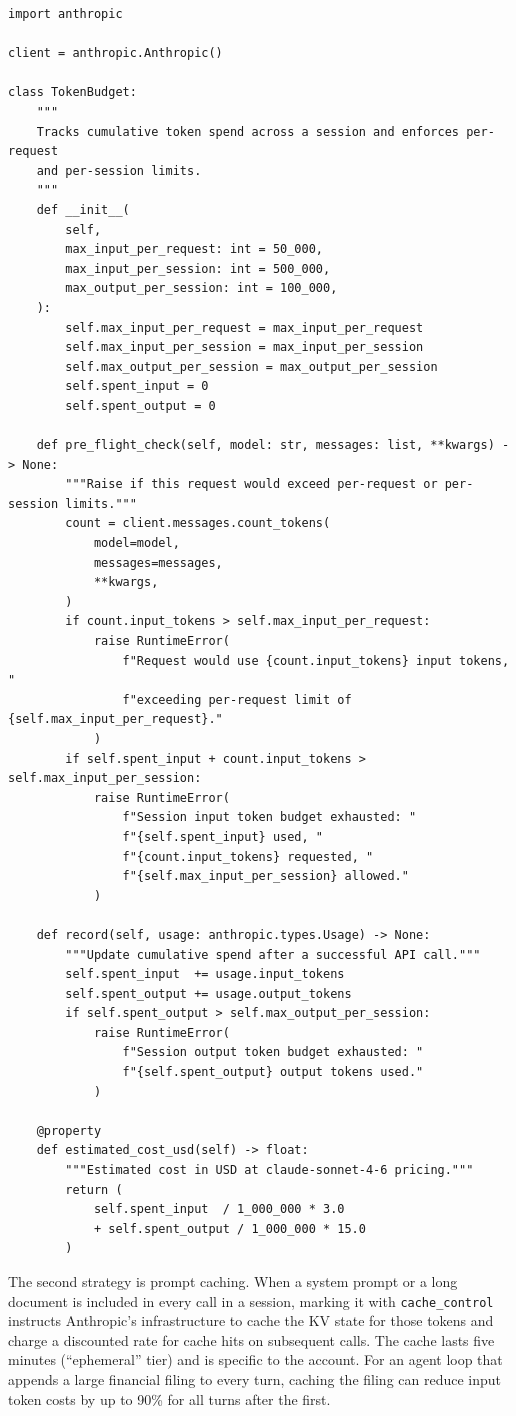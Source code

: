 \begin{verbatim}
import anthropic

client = anthropic.Anthropic()

class TokenBudget:
    """
    Tracks cumulative token spend across a session and enforces per-request
    and per-session limits.
    """
    def __init__(
        self,
        max_input_per_request: int = 50_000,
        max_input_per_session: int = 500_000,
        max_output_per_session: int = 100_000,
    ):
        self.max_input_per_request = max_input_per_request
        self.max_input_per_session = max_input_per_session
        self.max_output_per_session = max_output_per_session
        self.spent_input = 0
        self.spent_output = 0

    def pre_flight_check(self, model: str, messages: list, **kwargs) -> None:
        """Raise if this request would exceed per-request or per-session limits."""
        count = client.messages.count_tokens(
            model=model,
            messages=messages,
            **kwargs,
        )
        if count.input_tokens > self.max_input_per_request:
            raise RuntimeError(
                f"Request would use {count.input_tokens} input tokens, "
                f"exceeding per-request limit of {self.max_input_per_request}."
            )
        if self.spent_input + count.input_tokens > self.max_input_per_session:
            raise RuntimeError(
                f"Session input token budget exhausted: "
                f"{self.spent_input} used, "
                f"{count.input_tokens} requested, "
                f"{self.max_input_per_session} allowed."
            )

    def record(self, usage: anthropic.types.Usage) -> None:
        """Update cumulative spend after a successful API call."""
        self.spent_input  += usage.input_tokens
        self.spent_output += usage.output_tokens
        if self.spent_output > self.max_output_per_session:
            raise RuntimeError(
                f"Session output token budget exhausted: "
                f"{self.spent_output} output tokens used."
            )

    @property
    def estimated_cost_usd(self) -> float:
        """Estimated cost in USD at claude-sonnet-4-6 pricing."""
        return (
            self.spent_input  / 1_000_000 * 3.0
            + self.spent_output / 1_000_000 * 15.0
        )
\end{verbatim}

The second strategy is prompt caching. When a system prompt or a long document is
included in every call in a session, marking it with \texttt{cache\_control}
instructs Anthropic's infrastructure to cache the KV state for those tokens and charge
a discounted rate for cache hits on subsequent calls. The cache lasts five minutes
(``ephemeral'' tier) and is specific to the account. For an agent loop that appends a
large financial filing to every turn, caching the filing can reduce input token costs
by up to 90\% for all turns after the first.

